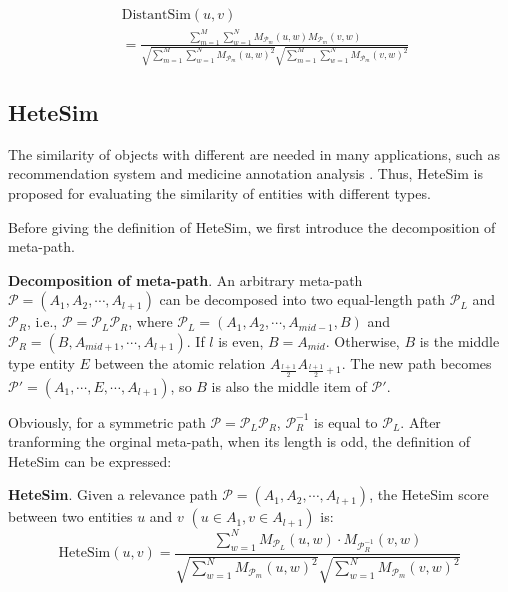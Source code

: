 \documentclass{acm_proc_article-csis8101}
\begin{document}
\begin{equation}
\begin{split}
& \text{DistantSim}(u, v) \\
& = \frac{\sum^{M}_{m=1}\sum^{N}_{w=1}M_{\mathcal{P}_{m}}(u,w)M_{\mathcal{P}_{m}}(v,w)}{\sqrt{\sum^{M}_{m=1}\sum^{N}_{w=1}M_{\mathcal{P}_{m}}(u,w)^2}\sqrt{\sum^{M}_{m=1}\sum^{N}_{w=1}M_{\mathcal{P}_{m}}(v,w)^2}}
\end{split}
\end{equation}

\subsection{HeteSim}
The similarity of objects with different are needed in many applications, such as recommendation system \cite{jamali2013heteromf} and medicine annotation analysis \cite{palma2013measuring}. Thus, HeteSim \cite{shi2014hetesim} is proposed for evaluating the similarity of entities with different types.

Before giving the definition of HeteSim, we first introduce the decomposition of meta-path.

\begin{definition}
{\bf Decomposition of meta-path}. An arbitrary meta-path $\mathcal{P}=(A_{1}, A_{2}, \cdots, A_{l+1})$ can be decomposed into two equal-length path $\mathcal{P}_{L}$ and $\mathcal{P}_{R}$, i.e., $\mathcal{P} = \mathcal{P}_{L}\mathcal{P}_{R}$, where $\mathcal{P}_{L}=(A_{1}, A_{2}, \cdots, A_{mid-1}, B)$ and $\mathcal{P}_{R}=(B, A_{mid+1}, \cdots, A_{l+1})$. If $l$ is even, $B=A_{mid}$. Otherwise, $B$ is the middle type entity $E$ between the atomic relation $A_{\frac{l+1}{2}}A_{\frac{l+1}{2}+1}$. The new path becomes $\mathcal{P}'=(A_{1}, \cdots, E, \cdots, A_{l+1})$, so $B$ is also the middle item of $\mathcal{P}'$.
\end{definition}

Obviously, for a symmetric path $\mathcal{P} = \mathcal{P}_{L}\mathcal{P}_{R}$, $\mathcal{P}_{R}^{-1}$ is equal to $\mathcal{P}_{L}$. After tranforming the orginal meta-path, when its length is odd, the definition of HeteSim can be expressed:

\begin{definition}
{\bf HeteSim}. Given a relevance path $\mathcal{P}=(A_{1}, A_{2}, \cdots, A_{l+1})$, the HeteSim score between two entities $u$ and $v$ $(u \in A_{1}, v \in A_{l+1})$ is:
\begin{equation}
\text{HeteSim}(u, v) = \frac{\sum^{N}_{w=1}M_{\mathcal{P}_{L}}(u, w) \cdot M_{\mathcal{P}_{R}^{-1}}(v, w)}{\sqrt{\sum^{N}_{w=1}M_{\mathcal{P}_{m}}(u,w)^2}\sqrt{\sum^{N}_{w=1}M_{\mathcal{P}_{m}}(v,w)^2}}
\end{equation}
\end{definition}
\end{document}
